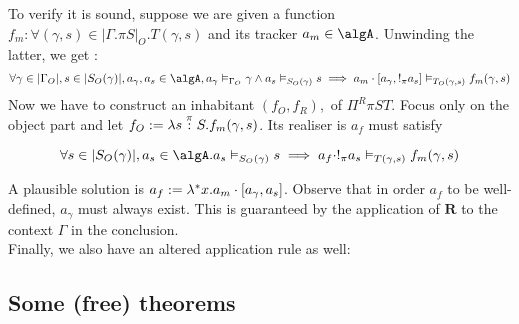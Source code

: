 \documentclass[12pt,a4paper]{article}
\def\src{_{src}}
\def\rfl{_{refl}}
\def\tgt{_{tgt}}
\renewcommand{\O}{_{O}}\alwaysmath{O}
\newcommand{\R}{\ensuremath{_{R}}}
\begin{document}
To verify it is sound, suppose we are given a function $f_m : \forall (\gamma , s) \in |\Gamma. \pi S|\O. T(\gamma, s)$ and its tracker $a_m \in \algA$. Unwinding the latter, we get :
$$\forall \gamma \in |\Gamma\O|, s \in |S\O(\gamma)|, a_\gamma, a_s \in \algA, a_\gamma \vDash_{\Gamma\O} \gamma \land a_s \vDash_{S\O(\gamma)} s \implies a_m \cdot [a_\gamma, !_\pi a_s] \vDash_{T\O(\gamma, s)} f_m(\gamma, s)$$
Now we have to construct an inhabitant $(f\O, f\R), $ of $\Pi^R \pi S T$. Focus only on the object part and let $f\O \define \lambda s \overset{\pi}{:} S. f_m(\gamma, s)$. Its realiser is $a_f$ must satisfy

$$ \forall s \in |S\O(\gamma)|, a_s \in \algA . a_s \vDash_{S\O(\gamma)} s \implies a_f \cdot !_\pi a_s \vDash_{T(\gamma, s)} f_m(\gamma, s) $$

A plausible solution is $a_f := \lambda^* x. a_m \cdot [a_\gamma, a_s]$. Observe that in order $a_f$ to be well-defined, $a_\gamma$ must always exist. This is guaranteed by the application of $\mathbf{R}$ to the context $\Gamma$ in the conclusion.\\

Finally, we also have an altered application rule as well:\\

\subsection{Some (free) theorems}
%
\end{document}
